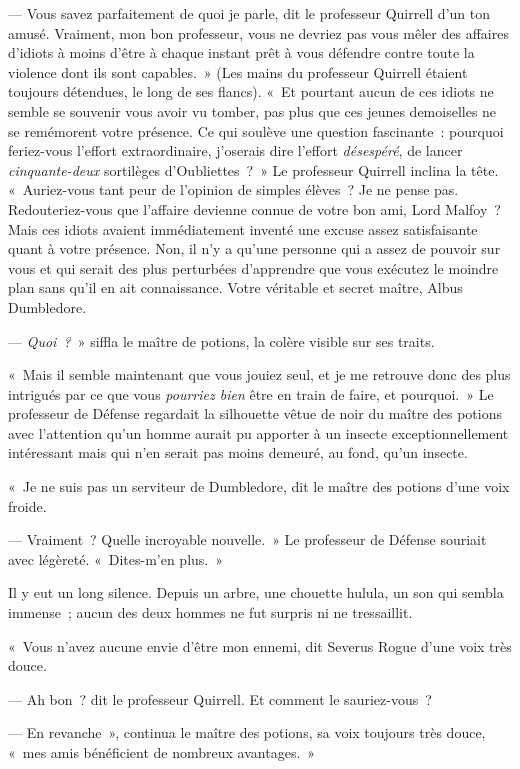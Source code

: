 --- Vous savez parfaitement de quoi je parle, dit le professeur Quirrell d'un ton amusé.
Vraiment, mon bon professeur, vous ne devriez pas vous mêler des affaires d'idiots à moins d'être à chaque instant prêt à vous défendre contre toute la violence dont ils sont capables.~»
(Les mains du professeur Quirrell étaient toujours détendues, le long de ses flancs).
«~Et pourtant aucun de ces idiots ne semble se souvenir vous avoir vu tomber, pas plus que ces jeunes demoiselles ne se remémorent votre présence.
Ce qui soulève une question fascinante~: pourquoi feriez-vous l'effort extraordinaire, j'oserais dire l'effort \emph{désespéré}, de lancer \emph{cinquante-deux} sortilèges d'Oubliettes~?~»
Le professeur Quirrell inclina la tête.
«~Auriez-vous tant peur de l'opinion de simples élèves~?
Je ne pense pas.
Redouteriez-vous que l'affaire devienne connue de votre bon ami, Lord Malfoy~?
Mais ces idiots avaient immédiatement inventé une excuse assez satisfaisante quant à votre présence.
Non, il n'y a qu'une personne qui a assez de pouvoir sur vous et qui serait des plus perturbées d'apprendre que vous exécutez le moindre plan sans qu'il en ait connaissance.
Votre véritable et secret maître, Albus Dumbledore.

--- \emph{Quoi~?}~» siffla le maître de potions, la colère visible sur ses traits.

«~Mais il semble maintenant que vous jouiez seul, et je me retrouve donc des plus intrigués par ce que vous \emph{pourriez bien} être en train de faire, et pourquoi.~»
Le professeur de Défense regardait la silhouette vêtue de noir du maître des potions avec l'attention qu'un homme aurait pu apporter à un insecte exceptionnellement intéressant mais qui n'en serait pas moins demeuré, au fond, qu'un insecte.

«~Je ne suis pas un serviteur de Dumbledore, dit le maître des potions d'une voix froide.

--- Vraiment~?
Quelle incroyable nouvelle.~»
Le professeur de Défense souriait avec légèreté.
«~Dites-m'en plus.~»

Il y eut un long silence.
Depuis un arbre, une chouette hulula, un son qui sembla immense~; aucun des deux hommes ne fut surpris ni ne tressaillit.

«~Vous n'avez aucune envie d'être mon ennemi, dit Severus Rogue d'une voix très douce.

--- Ah bon~? dit le professeur Quirrell.
Et comment le sauriez-vous~?

--- En revanche~», continua le maître des potions, sa voix toujours très douce, «~mes amis bénéficient de nombreux avantages.~»

